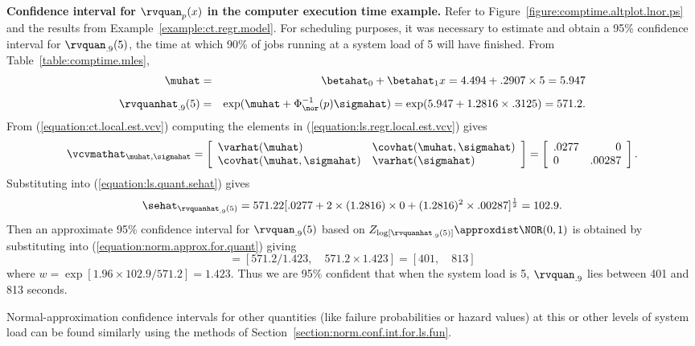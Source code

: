 \begin{example}
{\bf Confidence interval for $\rvquan_{p}(x)$ in the computer
execution time example.}
\label{example:regr.ci.for.quan}
Refer to Figure~\ref{figure:comptime.altplot.lnor.ps} and the results
from Example~\ref{example:ct.regr.model}.  For scheduling purposes, it
was necessary to estimate and obtain a 95\% confidence interval for
$\rvquan_{.9}(5)$, the time at which 90\% of jobs running at a system
load of 5 will have finished. From Table~\ref{table:comptime.mles},
\begin{eqnarray*}
\muhat & = & \betahat_{0} + \betahat_{1}x
	=  4.494 + .2907 \times 5  = 5.947 \\[1ex]
\rvquanhat_{.9}(5)  &=  & \exp(\muhat + \Phi_{\nor}^{-1}(p) \sigmahat)
		  = \exp( 5.947 + 1.2816 \times .3125) = 571.2.
\end{eqnarray*}
From
(\ref{equation:ct.local.est.vcv}) 
computing the elements in  (\ref{equation:ls.regr.local.est.vcv}) gives
\begin{displaymath}
\vcvmathat_{\muhat,\sigmahat}=
\left[ 
\begin{array}{ll}
\varhat(\muhat)& \covhat(\muhat,\sigmahat)\\
\covhat(\muhat,\sigmahat)& \varhat(\sigmahat)
\end{array}
\right]=
\left[ 
\begin{array}{lr}
 .0277 & 0 \\
 0 & .00287
\end{array}
\right].
\end{displaymath}
Substituting into
(\ref{equation:ls.quant.sehat}) gives
\begin{displaymath}
\sehat_{\rvquanhat_{.9}(5)}=  571.22 [ .0277 +
	2 \times (1.2816) \times 0 + (1.2816)^{2} \times .00287]^{\frac{1}{2}}=102.9.
\end{displaymath}
Then an approximate  95\% confidence
interval for $\rvquan_{.9}(5)$ based on $Z_{\log[\rvquanhat_{.9}(5)]}
\approxdist \NOR(0,1)$ is obtained by 
substituting into (\ref{equation:norm.approx.for.quant}) giving
\begin{displaymath}
[ \undertilde{\rvquan_{.9}}, \quad \tilde{\rvquan}_{.9} ]=
[571.2/1.423, \quad
571.2 \times 1.423] = [401, \quad  813]
\end{displaymath}
where $w=\exp[1.96 \times 102.9 / 571.2] = 1.423$.
Thus we are 95\% confident that when the system load is 5,
$\rvquan_{.9}$ lies between 401 and  813 seconds.
\end{example}
Normal-approximation confidence intervals for other quantities (like
failure probabilities or hazard values) at this or other levels of
system load can be found similarly using the methods of
Section~\ref{section:norm.conf.int.for.ls.fun}.

